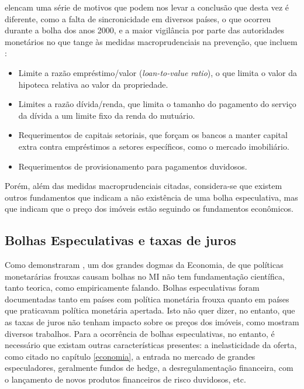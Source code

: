 \documentclass[
	12pt,				%
	oneside,			%
	a4paper,			%
	chapter=TITLE,		%
	section=TITLE,		%
	english,			%
	brazil				%
	]{abntex2}
\begin{document}
\textcite{fmitwa} elencam uma série de motivos que podem nos levar a conclusão que desta
vez é diferente, como a falta de sincronicidade em diversos países, o que
ocorreu durante a bolha dos anos 2000, e a maior vigilância por parte das
autoridades monetários no que tange às medidas macroprudenciais na prevenção,
que incluem \autocite{fmiem}:
\begin{itemize}
\tightlist
\item
  Limite a razão empréstimo/valor (\emph{loan-to-value ratio}), o que limita o valor
  da hipoteca relativa ao valor da propriedade.
\item
  Limites a razão dívida/renda, que limita o tamanho do pagamento do serviço da
  dívida a um limite fixo da renda do mutuário.
\item
  Requerimentos de capitais setoriais, que forçam os bancos a manter capital
  extra contra empréstimos a setores específicos, como o mercado imobiliário.
\item
  Requerimentos de provisionamento para pagamentos duvidosos.
\end{itemize}
Porém, além das medidas macroprudenciais citadas, considera-se que existem
outros fundamentos que indicam a não existência de uma bolha especulativa, mas
que indicam que o preço dos imóveis estão seguindo os fundamentos econômicos.

\hypertarget{bolhas-especulativas-e-taxas-de-juros}{%
\subsection{Bolhas Especulativas e taxas de juros}\label{bolhas-especulativas-e-taxas-de-juros}}

Como demonstraram \textcite{joebges}, um dos grandes dogmas da Economia, de que políticas
monetarárias frouxas causam bolhas no \gls{MI} não tem fundamentação científica,
tanto teorica, como empiricamente falando. Bolhas especulativas foram
documentadas tanto em países com política monetária frouxa quanto em países que
praticavam política monetária apertada. Isto não quer dizer, no entanto, que
as taxas de juros não tenham impacto sobre os preços dos imóveis, como mostram
diversos trabalhos. Para a ocorrência de bolhas especulativas, no entanto, é
necessário que existam outras características presentes: a inelasticidade da
oferta, como citado no capítulo \ref{economia}, a entrada no mercado de
grandes especuladores, geralmente fundos de hedge, a desregulamentação
financeira, com o lançamento de novos produtos financeiros de risco duvidosos,
etc.
\end{document}
